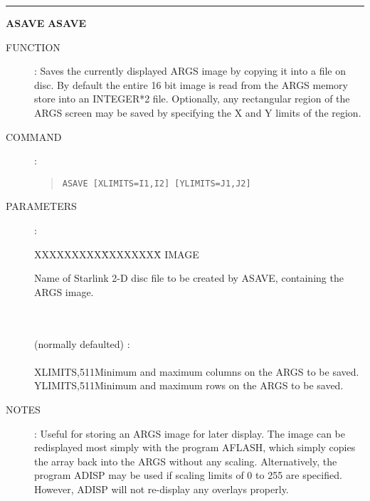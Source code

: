 \goodbreak
\rule{\textwidth}{0.3mm}
{\Large {\bf ASAVE} \hfill {\bf ASAVE}}
\begin{description}
\item [FUNCTION]:
Saves the currently displayed ARGS image by copying it into a file on disc.
By default the entire 16 bit image is read from the ARGS memory store into an
INTEGER*2 file.
Optionally, any rectangular region of the ARGS screen may be saved by
specifying the X and Y limits of the region.
\item [COMMAND]:
\begin{quote}
{\tt ASAVE [XLIMITS=I1,I2] [YLIMITS=J1,J2]}
\end{quote}
\item [PARAMETERS] :
\begin{tabbing}
XXXXXXXXX\=XXXXXXXX\=\kill
IMAGE\>\>\begin{minipage}[t]{100mm}
Name of Starlink 2-D disc file to be created by ASAVE, containing the ARGS image.
\end{minipage}\\
\\
(normally defaulted) :\\
\\
XLIMITS,511\>Minimum and maximum columns on the ARGS to be saved.\\
YLIMITS,511\>Minimum and maximum rows on the ARGS to be saved.
\end{tabbing}
\item [NOTES]:
Useful for storing an ARGS image for later display.
The image can be redisplayed most simply with the program AFLASH, which simply
copies the array back into the ARGS without any scaling.
Alternatively, the program ADISP may be used if scaling limits of 0 to 255 are
specified.
However, ADISP will not re-display any overlays properly.
\end{description}

